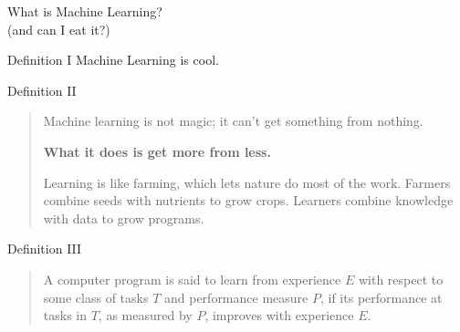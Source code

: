 
\begin{frame}
  \centering
  \vspace{0.4cm}
  {\huge \color{orange} What is Machine Learning?}\\
  \vspace{0.2cm}
  {\small (and can I eat it?)}
\end{frame}

\begin{slide}{Definition I}
  \centering
  \Large
  Machine Learning is cool.
\end{slide}

\begin{slide}{Definition II}
  \begin{quote}
    Machine learning is not magic; it can't get something from nothing.
    \pause
    \vspace{0.5cm}\\
    \begin{center}\textbf{What it does is get more from less.}\end{center}
    \vspace{0.5cm}
    \pause
    Learning is like farming, which lets nature do most of the work.
    Farmers combine seeds with nutrients to grow crops.
    Learners combine knowledge with data to grow programs.
  \end{quote}
  \cite{domingos2012}
\end{slide}

\begin{slide}{Definition III}
\begin{quote}
  A computer program is said to learn from experience $E$ with respect to some class of tasks $T$ and performance measure $P$, if its performance at tasks in $T$, as measured by $P$, improves with experience $E$.
\end{quote}
\cite{mitchell1997}
\end{slide}

